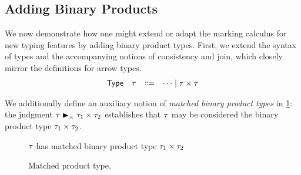 

\subsection{Adding Binary Products}
\label{sec:calculus-products}

We now demonstrate how one might extend or adapt the marking calculus for new typing features by
adding binary product types. First, we extend the syntax of types and the accompanying notions of
consistency and join, which closely mirror the definitions for arrow types.
%
\[\begin{array}{rrcl}
  \TMName  & \TMV  & \Coloneqq & \cdots \mid \TPair{\TMV}{\TMV}
\end{array}\]

We additionally define an auxiliary notion of \emph{matched binary product types} in
\cref{fig:calculus-matched-product}: the judgment $\matchedPair{\TMV}{\TMV_1}{\TMV_2}$ establishes
that $\TMV$ may be considered the binary product type $\TPair{\TMV_1}{\TMV_2}$.

\begin{figure}[htbp]
  \raggedright
   $\TMV$ has matched binary product type $\TPair{\TMV_1}{\TMV_2}$
  \begin{mathpar}

  \end{mathpar}
  \caption{Matched product type.}
  \label{fig:calculus-matched-product}
\end{figure}

